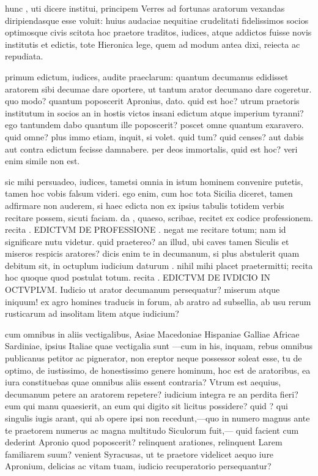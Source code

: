  hunc , uti dicere institui, principem Verres ad fortunas aratorum vexandas diripiendasque esse voluit: huius audaciae nequitiae crudelitati fidelissimos socios optimosque civis scitota hoc praetore traditos, iudices, atque addictos fuisse novis institutis et edictis, tote Hieronica lege, quem ad modum antea dixi, reiecta ac repudiata.

 primum edictum, iudices, audite praeclarum: quantum decumanus edidisset aratorem sibi decumae dare oportere, ut tantum arator decumano dare cogeretur. quo modo? quantum poposcerit Apronius, dato. quid est hoc? utrum praetoris institutum in socios an in hostis victos insani edictum atque imperium tyranni? ego tantundem dabo quantum ille poposcerit? poscet omne quantum exaravero. quid omne? plus immo etiam, inquit, si volet. quid tum? quid censes? aut dabis aut contra edictum fecisse damnabere. per deos immortalis, quid est hoc? veri enim simile non est.

 sic mihi persuadeo, iudices, tametsi omnia in istum hominem convenire putetis, tamen hoc vobis falsum videri. ego enim, cum hoc tota Sicilia diceret, tamen adfirmare non auderem, si haec edicta non ex ipsius tabulis totidem verbis recitare possem, sicuti faciam. da , quaeso, scribae, recitet ex codice professionem. recita . EDICTVM DE PROFESSIONE . negat me recitare totum; nam id significare nutu videtur. quid praetereo? an illud, ubi caves tamen Siculis et miseros respicis aratores? dicis enim te in decumanum, si plus abstulerit quam debitum sit, in octuplum iudicium daturum . nihil mihi placet praetermitti; recita hoc quoque quod postulat totum. recita . EDICTVM DE IVDICIO IN OCTVPLVM. Iudicio ut arator decumanum persequatur? miserum atque iniquum! ex agro homines traducis in forum, ab aratro ad subsellia, ab usu rerum rusticarum ad insolitam litem atque iudicium?

 cum omnibus in aliis vectigalibus, Asiae Macedoniae Hispaniae Galliae Africae Sardiniae, ipsius Italiae quae vectigalia sunt —cum in his, inquam, rebus omnibus publicanus petitor ac pignerator, non ereptor neque possessor soleat esse, tu de optimo, de iustissimo, de honestissimo genere hominum, hoc est de aratoribus, ea iura constituebas quae omnibus aliis essent contraria? Vtrum est aequius, decumanum petere an aratorem repetere? iudicium integra re an perdita fieri? eum qui manu quaesierit, an eum qui digito sit licitus possidere? quid ? qui singulis iugis arant, qui ab opere ipsi non recedunt,—quo in numero magnus ante te praetorem numerus ac magna multitudo Siculorum fuit,— quid facient cum dederint Apronio quod poposcerit? relinquent arationes, relinquent Larem familiarem suum? venient Syracusas, ut te praetore videlicet aequo iure Apronium, delicias ac vitam tuam, iudicio recuperatorio persequantur?

